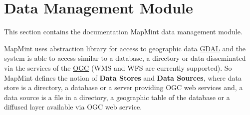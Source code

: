 \documentclass[letterpaper,10pt,english]{sphinxmanual}
\begin{document}
\chapter{Data Management Module}
\label{data/index:data}\label{data/index::doc}\label{data/index:module-de-gestion-des-donnees}
This section contains the documentation MapMint data management module.

MapMint uses abstraction library for access to geographic data \href{http://www.gdal.org}{GDAL} and the system is able to access similar to a database, a directory or data disseminated via the services of the \href{http://www.opengeospatial.org}{OGC} (WMS and WFS are currently supported). So MapMint defines the notion of \textbf{Data Stores} and \textbf{Data Sources}, where data store is a directory, a database or a server providing OGC web services and, a data source is a file in a directory, a geographic table of the database or a diffused layer available via OGC web service.
\end{document}
